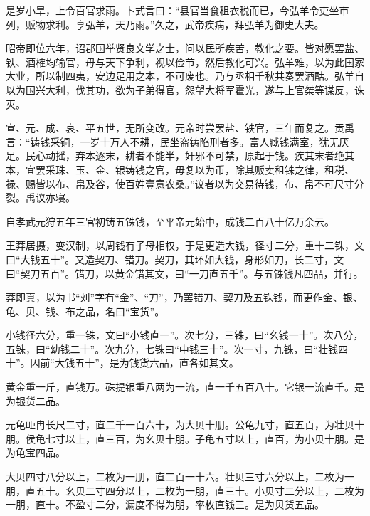 \documentclass[12pt,UTF8]{ctexbook}
\begin{document}
是岁小旱，上令百官求雨。卜式言曰：“县官当食租衣税而已，今弘羊令吏坐市列，贩物求利。亨弘羊，天乃雨。”久之，武帝疾病，拜弘羊为御史大夫。



昭帝即位六年，诏郡国举贤良文学之士，问以民所疾苦，教化之要。皆对愿罢盐、铁、酒榷均输官，毋与天下争利，视以俭节，然后教化可兴。弘羊难，以为此国家大业，所以制四夷，安边足用之本，不可废也。乃与丞相千秋共奏罢酒酤。弘羊自以为国兴大利，伐其功，欲为子弟得官，怨望大将军霍光，遂与上官桀等谋反，诛灭。



宣、元、成、哀、平五世，无所变改。元帝时尝罢盐、铁官，三年而复之。贡禹言：“铸钱采铜，一岁十万人不耕，民坐盗铸陷刑者多。富人臧钱满室，犹无厌足。民心动摇，弃本逐末，耕者不能半，奸邪不可禁，原起于钱。疾其末者绝其本，宜罢采珠、玉、金、银铸钱之官，毋复以为币，除其贩卖租铢之律，租税、禄、赐皆以布、帛及谷，使百姓壹意农桑。”议者以为交易待钱，布、帛不可尺寸分裂。禹议亦寝。



自孝武元狩五年三官初铸五铢钱，至平帝元始中，成钱二百八十亿万余云。



王莽居摄，变汉制，以周钱有子母相权，于是更造大钱，径寸二分，重十二铢，文曰“大钱五十”。又造契刀、错刀。契刀，其环如大钱，身形如刀，长二寸，文曰“契刀五百”。错刀，以黄金错其文，曰“一刀直五千”。与五铢钱凡四品，并行。



莽即真，以为书“刘”字有“金”、“刀”，乃罢错刀、契刀及五铢钱，而更作金、银、龟、贝、钱、布之品，名曰“宝货”。



小钱径六分，重一铢，文曰“小钱直一”。次七分，三铢，曰“幺钱一十”。次八分，五铢，曰“幼钱二十”。次九分，七铢曰“中钱三十”。次一寸，九铢，曰“壮钱四十”。因前“大钱五十”，是为钱货六品，直各如其文。



黄金重一斤，直钱万。硃提银重八两为一流，直一千五百八十。它银一流直千。是为银货二品。



元龟岠冉长尺二寸，直二千一百六十，为大贝十朋。公龟九寸，直五百，为壮贝十朋。侯龟七寸以上，直三百，为幺贝十朋。子龟五寸以上，直百，为小贝十朋。是为龟宝四品。



大贝四寸八分以上，二枚为一朋，直二百一十六。壮贝三寸六分以上，二枚为一朋，直五十。幺贝二寸四分以上，二枚为一朋，直三十。小贝寸二分以上，二枚为一朋，直十。不盈寸二分，漏度不得为朋，率枚直钱三。是为贝货五品。
\end{document}
